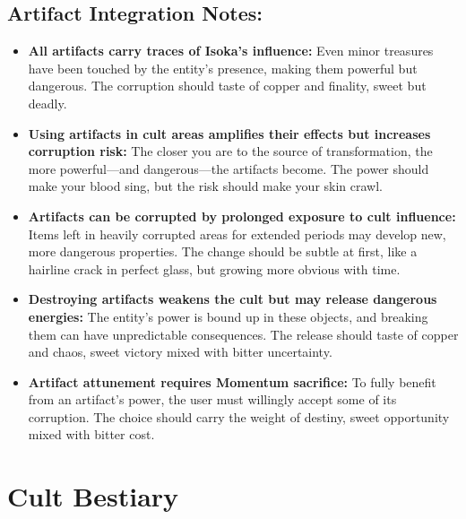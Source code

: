 \documentclass[11pt]{article}
\begin{document}
\subsection{Artifact Integration Notes:}
\begin{itemize}
\item \textbf{All artifacts carry traces of Isoka's influence:} Even minor treasures have been touched by the entity's presence, making them powerful but dangerous. The corruption should taste of copper and finality, sweet but deadly.
\item \textbf{Using artifacts in cult areas amplifies their effects but increases corruption risk:} The closer you are to the source of transformation, the more powerful—and dangerous—the artifacts become. The power should make your blood sing, but the risk should make your skin crawl.
\item \textbf{Artifacts can be corrupted by prolonged exposure to cult influence:} Items left in heavily corrupted areas for extended periods may develop new, more dangerous properties. The change should be subtle at first, like a hairline crack in perfect glass, but growing more obvious with time.
\item \textbf{Destroying artifacts weakens the cult but may release dangerous energies:} The entity's power is bound up in these objects, and breaking them can have unpredictable consequences. The release should taste of copper and chaos, sweet victory mixed with bitter uncertainty.
\item \textbf{Artifact attunement requires Momentum sacrifice:} To fully benefit from an artifact's power, the user must willingly accept some of its corruption. The choice should carry the weight of destiny, sweet opportunity mixed with bitter cost.
\end{itemize}

\section{Cult Bestiary}
\end{document}
